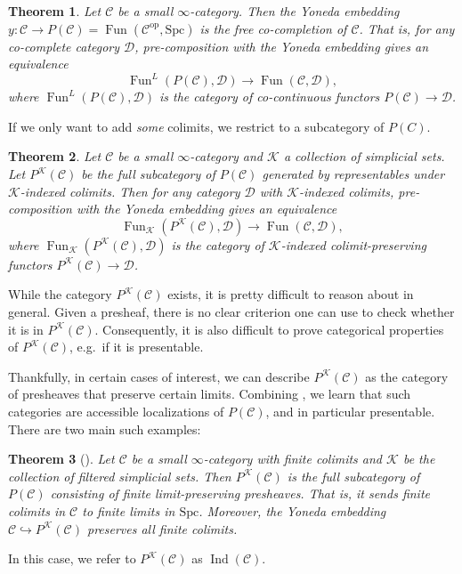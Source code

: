 \documentclass{shortart}
\newtheorem{thm}{Theorem}[section]
\theoremstyle{definition}
\newcommand\C{{\mathcal{C}}}
\newcommand\D{{\mathcal{D}}}
\newcommand\Spc{{\mathrm{Spc}}}
\newcommand\op{{\mathrm{op}}}
\DeclareMathOperator\Fun{Fun}
\DeclareMathOperator\Ind{Ind}
\begin{document}
\begin{thm}{{\cite[Theorem 5.1.5.6]{htt}}}
  Let $\C$ be a small $\infty$-category. Then the Yoneda embedding $y\colon \C \to P(\C) = \Fun(\C^\op, \Spc)$ is the free co-completion of $\C$. That is, for any co-complete category $\D$, pre-composition with the Yoneda embedding gives an equivalence
  \[
    \Fun^L(P(\C), \D) \to \Fun(\C, \D),
  \]
  where $\Fun^L(P(\C), \D)$ is the category of co-continuous functors $P(\C)\to \D$.
\end{thm}

If we only want to add \emph{some} colimits, we restrict to a subcategory of $P(C)$.

\begin{thm}{{\cite[Proposition 5.3.6.2]{htt}}}
  Let $\C$ be a small $\infty$-category and $\mathcal{K}$ a collection of simplicial sets. Let $P^{\mathcal{K}}(\C)$ be the full subcategory of $P(\C)$ generated by representables under $\mathcal{K}$-indexed colimits. Then for any category $\D$ with $\mathcal{K}$-indexed colimits, pre-composition with the Yoneda embedding gives an equivalence
  \[
    \Fun_{\mathcal{K}}(P^{\mathcal{K}}(\C), \D) \to \Fun(\C, \D),
  \]
  where $\Fun_{\mathcal{K}}(P^{\mathcal{K}}(\C), \D)$ is the category of $\mathcal{K}$-indexed colimit-preserving functors $P^{\mathcal{K}}(\C) \to \D$.
\end{thm}

While the category $P^{\mathcal{K}}(\C)$ exists, it is pretty difficult to reason about in general. Given a presheaf, there is no clear criterion one can use to check whether it is in $P^{\mathcal{K}}(\C)$. Consequently, it is also difficult to prove categorical properties of $P^{\mathcal{K}}(\C)$, e.g.\ if it is presentable.

Thankfully, in certain cases of interest, we can describe $P^{\mathcal{K}}(\C)$ as the category of presheaves that preserve certain limits. Combining \cite[Lemmas 5.5.4.16-18]{htt}, we learn that such categories are accessible localizations of $P(\C)$, and in particular presentable. There are two main such examples:

\begin{thm}[{\cite[Corollary 5.3.5.4]{htt}}]
  Let $\C$ be a small $\infty$-category with finite colimits and $\mathcal{K}$ be the collection of filtered simplicial sets. Then $P^{\mathcal{K}}(\C)$ is the full subcategory of $P(\C)$ consisting of finite limit-preserving presheaves. That is, it sends finite colimits in $\C$ to finite limits in $\Spc$. Moreover, the Yoneda embedding $\C \hookrightarrow P^{\mathcal{K}}(\C)$ preserves all finite colimits.
\end{thm}
In this case, we refer to $P^{\mathcal{K}}(\C)$ as $\Ind(\C)$.
\end{document}
